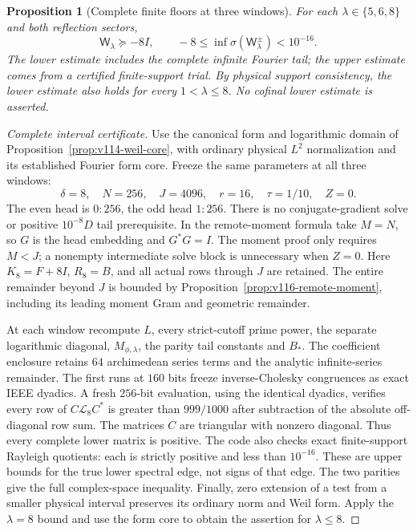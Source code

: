 \documentclass[11pt]{article}
\newtheorem{proposition}[theorem]{Proposition}
\theoremstyle{remark}
\begin{document}
\begin{proposition}[Complete finite floors at three windows]
\label{prop:v138-three-floors}
For each $\lambda\in\{5,6,8\}$ and both reflection sectors,
\begin{equation}\label{eq:v138-three-floors}
 \mathsf W_\lambda\succeq-8I,\qquad
 -8\le\inf\sigma(\mathsf W_\lambda^{\pm})<10^{-16}.
\end{equation}
The lower estimate includes the complete infinite Fourier tail;
the upper estimate comes from a certified finite-support trial.
By physical support consistency, the lower estimate also holds for
every $1<\lambda\le8$. No cofinal lower estimate is asserted.
\end{proposition}
\begin{proof}[Complete interval certificate]
Use the canonical form and logarithmic domain of
Proposition~\ref{prop:v114-weil-core}, with ordinary physical
$L^2$ normalization and its established Fourier form core. Freeze
the same parameters at all three windows:
\[
 \delta=8,\quad N=256,\quad J=4096,\quad r=16,
 \quad\tau=1/10,\quad Z=0.
\]
The even head is $0{:}256$, the odd head $1{:}256$. There is no
conjugate-gradient solve or positive $10^{-8}D$ tail prerequisite.
In the remote-moment formula take $M=N$, so $G$ is the head embedding
and $G^*G=I$. The moment proof only requires $M<J$; a nonempty
intermediate solve block is unnecessary when $Z=0$.
Here $K_8=F+8I$, $R_8=B$, and all actual rows through $J$ are retained.
The entire remainder beyond $J$ is bounded by
Proposition~\ref{prop:v116-remote-moment}, including its leading
moment Gram and geometric remainder.

At each window recompute $L$, every strict-cutoff prime power,
the separate logarithmic diagonal, $M_{\phi,\lambda}$, the parity
tail constants and $B_*$. The coefficient enclosure retains $64$
archimedean series terms and the analytic infinite-series remainder.
The first runs at $160$ bits freeze inverse-Cholesky congruences as
exact IEEE dyadics. A fresh $256$-bit evaluation, using the identical
dyadics, verifies every row of
$C\mathcal L_8C^*$ is greater than $999/1000$ after subtraction
of the absolute off-diagonal row sum. The matrices $C$ are triangular
with nonzero diagonal. Thus every complete lower matrix is positive.
The code also checks exact finite-support Rayleigh quotients: each
is strictly positive and less than $10^{-16}$. These are upper
bounds for the true lower spectral edge, not signs of that edge.
The two parities give the full complex-space inequality.
Finally, zero extension of a test from a smaller physical interval
preserves its ordinary norm and Weil form. Apply the $\lambda=8$
bound and use the form core to obtain the assertion for $\lambda\le8$.
\end{proof}
\end{document}
